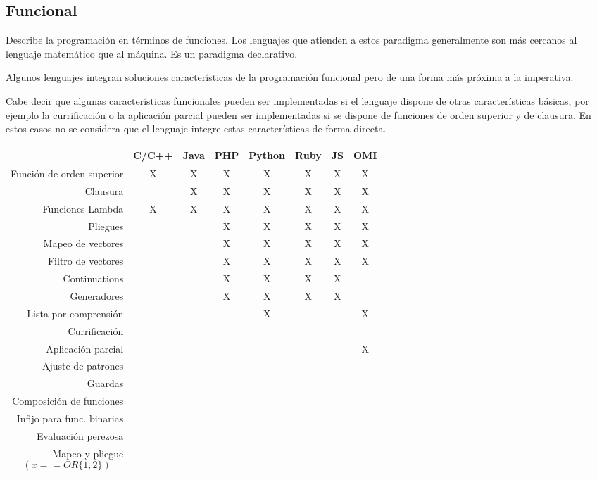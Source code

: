 \subsection {Funcional}
Describe la programación en términos de funciones. Los lenguajes que atienden a 
estos paradigma generalmente son más cercanos al lenguaje matemático que al máquina.
Es un paradigma declarativo. 

Algunos lenguajes integran soluciones características de la programación funcional pero de una forma más próxima a la imperativa.

Cabe decir que algunas características funcionales pueden ser implementadas 
si el lenguaje dispone de otras características básicas, 
por ejemplo la currificación o la aplicación parcial pueden 
ser implementadas si se dispone de funciones de orden superior y de clausura. En estos casos 
no se considera que el lenguaje integre estas características de forma directa.

\FloatBarrier
\begin{table}[h]
\begin{center}
\begin{tabular}{|r|c|c|c|c|c|c|c|} \hline
 & C/C++ & Java & PHP  & Python & Ruby & JS & OMI\\ \hline
Función de orden superior & X & X & X & X & X & X & X \\ \hline
Clausura  &  & X & X & X & X & X & X \\ \hline
Funciones Lambda  &X & X  & X & X & X & X & X \\ \hline
Pliegues & & & X & X & X & X & X \\ \hline
Mapeo de vectores & & & X & X & X & X & X \\ \hline
Filtro de vectores & & & X & X & X & X & X \\ \hline
Continuations &  &  & X & X & X & X &  \\ \hline
Generadores & & & X & X & X & X &  \\ \hline
Lista por comprensión & & &  & X & &  & X \\ \hline
Currificación  & & &  &  &  &  &  \\ \hline
Aplicación parcial & & & & & & & X \\ \hline
Ajuste de patrones & & & & & & &  \\ \hline
Guardas & & & & & & &  \\ \hline
Composición de funciones & & & & & & &  \\ \hline
Infijo para func. binarias & & & & & & &  \\ \hline
Evaluación perezosa & & & & & & &  \\ \hline
Mapeo y pliegue $$(x ==OR \{1,2\})$$ & & & & & & &  \\ \hline
\end{tabular}
\end{center}
\end{table}
\FloatBarrier


